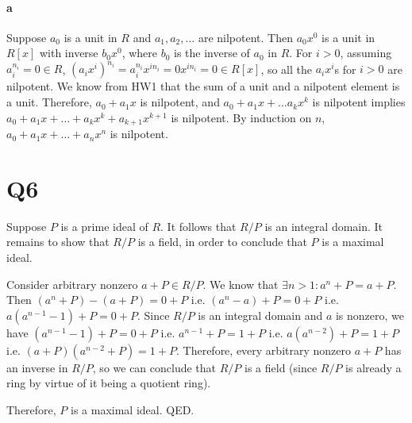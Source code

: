 \documentclass[]{article}
\begin{document}
 \paragraph{a}
	Suppose $a_0$ is a unit in $R$ and $a_1, a_2, \dots$ are nilpotent.\newline
	Then $a_0x^0$ is a unit in $R[x]$ with inverse $b_0x^0$, where $b_0$ is the inverse of $a_0$ in $R$.\newline
	For $i > 0$, assuming $a_i^{n_i} = 0 \in R$, $(a_ix^i)^{n_i} = a_i^{n_i}x^{in_i} = 0x^{in_i} = 0 \in R[x]$, so all the $a_ix^i$s for $i > 0$ are nilpotent.\newline
	We know from HW1 that the sum of a unit and a nilpotent element is a unit.\newline
	Therefore, $a_0 + a_1x$ is nilpotent, and $a_0 + a_1x + \dots a_kx^k $ is nilpotent implies $a_0 + a_1x + \dots + a_kx^k + a_{k+1}x^{k+1}$ is nilpotent.\newline
	By induction on $n$, $a_0 + a_1x + \dots + a_nx^n$ is nilpotent.\newline

\section*{Q6}
	Suppose $P$ is a prime ideal of $R$.\newline
	It follows that $R/P$ is an integral domain.\newline
	It remains to show that $R/P$ is a field, in order to conclude that $P$ is a maximal ideal.\newline\newline
	
	Consider arbitrary nonzero $a + P \in R/P$. We know that $\exists n > 1: a^n + P = a + P$.\newline
	Then $(a^n + P) - (a + P) = 0 + P$ i.e. $(a^n - a) + P = 0 + P$ i.e. $a(a^{n-1} - 1) + P = 0 + P$.\newline
	Since $R/P$ is an integral domain and $a$ is nonzero, we have $(a^{n-1} - 1) + P = 0 + P$ i.e. $a^{n-1} + P = 1 + P$ i.e. $a(a^{n-2}) + P = 1 + P$ i.e. $(a + P)(a^{n-2} + P) = 1 + P$.\newline
	Therefore, every arbitrary nonzero $a + P$ has an inverse in $R/P$, so we can conclude that $R/P$ is a field (since $R/P$ is already a ring by virtue of it being a quotient ring).\newline\newline
	
	Therefore, $P$ is a maximal ideal. QED.
\end{document}
